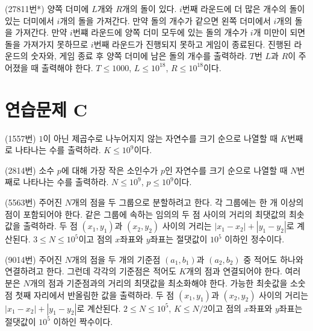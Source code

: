 \begin{problem}
    (27811번*) 양쪽 더미에 $L$개와 $R$개의 돌이 있다. $i$번째 라운드에 더 많은 개수의 돌이 있는 더미에서 $i$개의 돌을 가져간다. 만약 돌의 개수가 같으면 왼쪽 더미에서 $i$개의 돌을 가져간다. 만약 $i$번쨰 라운드에 양쪽 더미 모두에 있는 돌의 개수가 $i$개 미만이 되면 돌을 가져가지 못하므로 $i$번째 라운드가 진행되지 못하고 게임이 종료된다. 진행된 라운드의 숫자와, 게임 종료 후 양쪽 더미에 남은 돌의 개수를 출력하라. $T$번 $L$과 $R$이 주어졌을 때 출력해야 한다. $T \leq 1000$, $L \leq 10^{18}$, $R \leq 10^{18}$이다.
\end{problem}

\section{연습문제 C}
\begin{problem}
    (1557번) $1$이 아닌 제곱수로 나누어지지 않는 자연수를 크기 순으로 나열할 때 $K$번째로 나타나는 수를 출력하라. $K \leq 10^9$이다.
\end{problem}

\begin{problem}
    (2814번) 소수 $p$에 대해 가장 작은 소인수가 $p$인 자연수를 크기 순으로 나열할 때 $N$번째로 나타나는 수를 출력하라. $N \leq 10^9$, $p \leq 10^9$이다.
\end{problem}

\begin{problem}
    (5563번) 주어진 $N$개의 점을 두 그룹으로 분할하려고 한다. 각 그룹에는 한 개 이상의 점이 포함되어야 한다. 같은 그룹에 속하는 임의의 두 점 사이의 거리의 최댓값의 최솟값을 출력하라. 두 점 $(x_1, y_1)$과 $(x_2, y_2)$ 사이의 거리는 $|x_1 - x_2| + |y_1 - y_2|$로 계산된다. $3 \leq N \leq 10^5$이고 점의 $x$좌표와 $y$좌표는 절댓값이 $10^5$ 이하인 정수이다.
\end{problem}

\begin{problem}
    (9014번) 주어진 $N$개의 점을 두 개의 기준점 $(a_1, b_1)$과 $(a_2, b_2)$ 중 적어도 하나와 연결하려고 한다. 그런데 각각의 기준점은 적어도 $K$개의 점과 연결되어야 한다. 여러분은 $N$개의 점과 기준점과의 거리의 최댓값을 최소화해야 한다. 가능한 최솟값을 소숫점 첫째 자리에서 반올림한 값을 출력하라. 두 점 $(x_1, y_1)$과 $(x_2, y_2)$ 사이의 거리는 $|x_1 - x_2| + |y_1 - y_2|$로 계산된다. $2 \leq N \leq 10^5$, $K \leq N/2$이고 점의 $x$좌표와 $y$좌표는 절댓값이 $10^5$ 이하인 짝수이다.
\end{problem}

